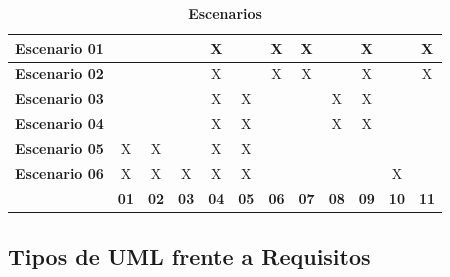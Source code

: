 \begin{table}[H]
	\centering
	\caption{\textbf{Escenarios}}
	\label{Escenarios}
	\begin{tabular}{|c|c|c|c|c|c|c|c|c|c|c|c|}
		\hline
		\textbf{Escenario 01} &             &             &             & X           &             & X           & X           &             & X           &             & X           \\ \hline
		\textbf{Escenario 02} &             &             &             & X           &             & X           & X           &             & X           &             & X           \\ \hline
		\textbf{Escenario 03} &             &             &             & X           & X           &             &             & X           & X           &             &             \\ \hline
		\textbf{Escenario 04} &             &             &             & X           & X           &             &             & X           & X           &             &             \\ \hline
		\textbf{Escenario 05} & X           & X           &             & X           & X           &             &             &             &             &             &             \\ \hline
		\textbf{Escenario 06} & X           & X           & X           & X           & X           &             &             &             &             & X           &             \\ \hline
		\textbf{}             & \textbf{01} & \textbf{02} & \textbf{03} & \textbf{04} & \textbf{05} & \textbf{06} & \textbf{07} & \textbf{08} & \textbf{09} & \textbf{10} & \textbf{11} \\ \hline
	\end{tabular}
\end{table}

\subsection{Tipos de UML frente a Requisitos}

